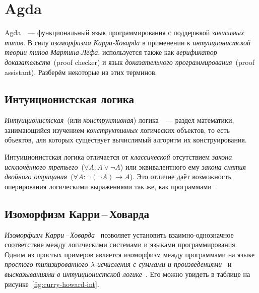 \section{Agda}

Agda~\cite{agda}~--- функциональный язык программирования с поддержкой
\emph{зависимых типов}. В силу \emph{изоморфизма Карри-Ховарда} в
применении к \emph{интуиционистской теории типов Мартина-Лёфа},
используется также как \emph{верификатор доказательств}~(proof
checker) и язык \emph{доказательного программирования}~(proof assistant).
Разберём некоторые из этих терминов.

\subsection{Интуиционистская логика}

\emph{Интуиционистская}~(или \emph{конструктивная})
логика~\cite{шень2,curryhoward}~--- раздел математики, занимающийся
изучением \emph{конструктивных} логических объектов, то есть объектов,
для которых существует вычислимый алгоритм их конструирования.


Интуиционистская логика отличается от \emph{классической} отсутствием
\emph{закона исключённого третьего}~($\forall A : A \vee \neg A$) или
эквивалентного ему \emph{закона снятия двойного отрицания}~($\forall A
: \neg (\neg A) \to A$). Это отличие даёт возможность оперирования
логическими выражениями так же, как программами~\cite{mltt, howard69}.

\subsection{Изоморфизм Карри\,–\,Ховарда}

\emph{Изоморфизм Карри\,--\,Ховарда}~\cite{curryhoward} позволяет
установить взаимно-однозначное соответствие между логическими
системами и языками программирования. Одним из простых примеров
является изоморфизм между программами на языке \emph{простого
  типизированного $\lambda$-исчисления с суммами и
  произведениями}~\cite{curryhoward} и \emph{высказываниями в
  интуиционистской логике}~\cite{curryhoward}. Его можно увидеть в
таблице на рисунке~\ref{fig:curry-howard-int}. 

